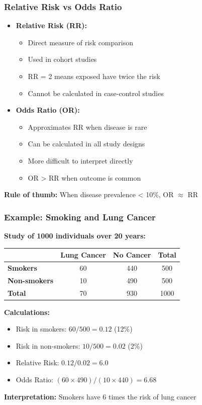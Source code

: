 \documentclass{beamer}
\begin{document}
\begin{frame}
\frametitle{Relative Risk vs Odds Ratio}
\begin{itemize}
\item \textbf{Relative Risk (RR):}
  \begin{itemize}
  \item Direct measure of risk comparison
  \item Used in cohort studies
  \item RR = 2 means exposed have twice the risk
  \item Cannot be calculated in case-control studies
  \end{itemize}
\item \textbf{Odds Ratio (OR):}
  \begin{itemize}
  \item Approximates RR when disease is rare
  \item Can be calculated in all study designs
  \item More difficult to interpret directly
  \item OR > RR when outcome is common
  \end{itemize}
\end{itemize}

\vspace{0.5cm}
\textbf{Rule of thumb:} When disease prevalence < 10\%, OR $\approx$ RR
\end{frame}

\begin{frame}
\frametitle{Example: Smoking and Lung Cancer}
\textbf{Study of 1000 individuals over 20 years:}

\begin{center}
\begin{tabular}{|l|c|c|c|}
\hline
& \textbf{Lung Cancer} & \textbf{No Cancer} & \textbf{Total} \\
\hline
\textbf{Smokers} & 60 & 440 & 500 \\
\hline
\textbf{Non-smokers} & 10 & 490 & 500 \\
\hline
\textbf{Total} & 70 & 930 & 1000 \\
\hline
\end{tabular}
\end{center}

\vspace{0.3cm}
\textbf{Calculations:}
\begin{itemize}
\item Risk in smokers: $60/500 = 0.12$ (12\%)
\item Risk in non-smokers: $10/500 = 0.02$ (2\%)
\item Relative Risk: $0.12/0.02 = 6.0$
\item Odds Ratio: $(60 \times 490)/(10 \times 440) = 6.68$
\end{itemize}

\textbf{Interpretation:} Smokers have 6 times the risk of lung cancer
\end{frame}
\end{document}
